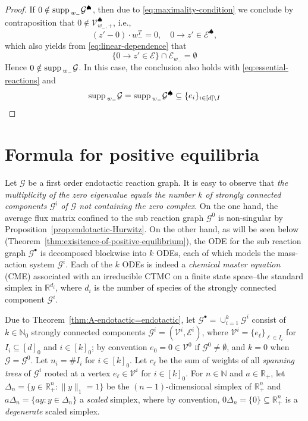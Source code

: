 \documentclass[10pt]{amsart}
\numberwithin{equation}{section}
\theoremstyle{plain}
\theoremstyle{definition}
\theoremstyle{remark}
\newcommand{\cE}{\mathcal{E}}
\newcommand{\cG}{\mathcal{G}}
\newcommand{\cI}{I}
\newcommand{\cV}{\mathcal{V}}
\newcommand{\supp}{{\rm supp\,}}
\begin{document}
\begin{proof}
If $0\notin\supp_{w_-}\cG^{\spadesuit}$, then due to \eqref{eq:maximality-condition} we conclude by contraposition that $0\notin \cV^{\spadesuit}_{w_-,+}$, i.e., $$(z'-0)\cdot w_-^T=0,\quad 0\to z'\in \cE^{\spadesuit},$$ 
which also yields from \eqref{eq:linear-dependence} that $$\{0\to z'\in\cE\}\cap\cE_{w_-}=\emptyset$$ Hence $0\notin\supp_{w_-}\cG$. In this case, the conclusion also holds with \eqref{eq:essential-reactions} and
$$\supp_{w_-}\cG=\supp_{w_-}\cG^{\spadesuit}\subseteq\{e_i\}_{i\in[d]\setminus\cI}$$
\end{proof}

\section{Formula for positive equilibria}\label{subsec:formular_for_positive_equilibria}

Let $\cG$ be a first order endotactic reaction graph. It is easy to observe that \emph{the multiplicity of the zero eigenvalue equals the number $k$ of strongly connected components $\cG^i$ of $\cG$ not containing the zero complex}. On the one hand, the average flux matrix confined to the sub reaction graph $\cG^0$ is non-singular by Proposition~\ref{prop:endotactic-Hurwitz}. On the other hand, as will be seen below (Theorem~\ref{thm:exisitence-of-positive-equilibrium}), the ODE for the sub reaction graph $\cG^{\bullet}$ is decomposed blockwise into $k$ ODEs, each of which models the mass-action system $\cG^i$. Each  of the $k$ ODEs is indeed a \emph{chemical master equation} (CME) associated with an irreducible CTMC on a finite state space\---the standard simplex in $\mathbb{R}^{d_i}$, where $d_i$ is the number of species of the strongly connected component $\cG^i$.




Due to Theorem~\ref{thm:A-endotactic=endotactic}, let  $\mathcal{G}^{\bullet}=\cup_{i=1}^k\mathcal{G}^i$ consist of $k\in\mathbb{N}_0$ strongly connected components $\cG^i=(\cV^i,\cE^i)$, where $\cV^i=\{e_\ell\}_{\ell\in\cI_i}$ for $\cI_i\subseteq[d]_0$ and $i\in[k]_0$; by convention $e_0=0\in\cV^0$ if $\cG^0\neq\emptyset$, and $k=0$ when $\cG=\cG^0$. Let $n_i=\#\cI_i$ for $i\in[k]_0$. Let $c_{\ell}$ be the sum of weights of all \emph{spanning trees} of $\cG^i$ rooted at a vertex $e_{\ell}\in\cV^i$ for $i\in[k]_0$.
For $n\in\mathbb{N}$ and $a\in\mathbb{R}_+$, let $\Delta_n=\{y\in\mathbb{R}^n_+\colon \|y\|_1=1\}$ be the $(n-1)$-dimensional simplex of $\mathbb{R}^n_+$ and $a\Delta_n=\{ay\colon y\in\Delta_{n}\}$ a \emph{scaled} simplex, where by convention,  $0\Delta_n=\{0\}\subseteq\mathbb{R}^n_+$ is a \emph{degenerate}  scaled simplex.
\end{document}
